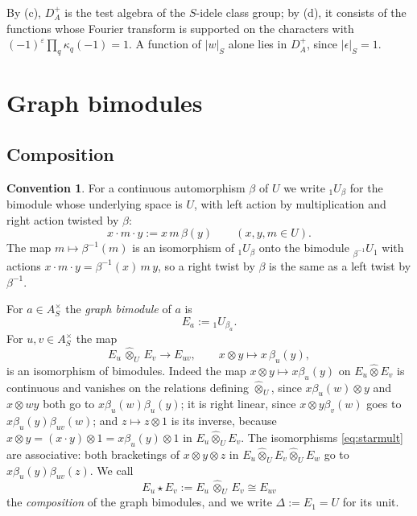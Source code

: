 \documentclass[11pt]{amsart}
\theoremstyle{definition}
\newtheorem{convention}[theorem]{Convention}
\theoremstyle{remark}
\newcommand{\DA}{D_A}
\begin{document}
By (c), $\DA^{+}$ is the test algebra of the $S$-idele class group; by (d),
it consists of the functions whose Fourier transform is supported on the
characters with $(-1)^{\varepsilon}\prod_q\kappa_q(-1)=1$.  A function of
$|w|_S$ alone lies in $\DA^{+}$, since $|\epsilon|_S=1$.

\section{Graph bimodules}\label{sec:cat}

\subsection{Composition}

\begin{convention}\label{conv:twist}
For a continuous automorphism $\beta$ of $U$ we write ${}_{1}U_{\beta}$ for the
bimodule whose underlying space is $U$, with left action by multiplication and
right action twisted by $\beta$:
\[
x\cdot m\cdot y:=x\,m\,\beta(y)\qquad(x,y,m\in U).
\]
The map $m\mapsto\beta^{-1}(m)$ is an isomorphism of ${}_{1}U_{\beta}$ onto the
bimodule ${}_{\beta^{-1}}U_{1}$ with actions $x\cdot m\cdot y=\beta^{-1}(x)\,m\,y$,
so a right twist by $\beta$ is the same as a left twist by $\beta^{-1}$.
\end{convention}

For $a\in A_S^{\times}$ the \emph{graph bimodule} of $a$ is
\begin{equation}\label{eq:graphbimod}
E_a:={}_{1}U_{\beta_a} .
\end{equation}
For $u,v\in A_S^{\times}$ the map
\begin{equation}\label{eq:starmult}
E_u\,\widehat\otimes_U\,E_v\longrightarrow E_{uv},\qquad
x\otimes y\mapsto x\,\beta_u(y),
\end{equation}
is an isomorphism of bimodules.  Indeed the map
$x\otimes y\mapsto x\beta_u(y)$ on $E_u\widehat\otimes E_v$ is continuous and
vanishes on the relations defining $\widehat\otimes_U$, since
$x\beta_u(w)\otimes y$ and $x\otimes wy$ both go to $x\beta_u(w)\beta_u(y)$; it
is right linear, since $x\otimes y\beta_v(w)$ goes to
$x\beta_u(y)\beta_{uv}(w)$; and $z\mapsto z\otimes1$ is its inverse, because
$x\otimes y=(x\cdot y)\otimes1=x\beta_u(y)\otimes1$ in
$E_u\widehat\otimes_UE_v$.  The isomorphisms \eqref{eq:starmult} are
associative: both bracketings of $x\otimes y\otimes z$ in
$E_u\widehat\otimes_UE_v\widehat\otimes_UE_w$ go to
$x\beta_u(y)\beta_{uv}(z)$.  We call
\[
E_u\star E_v:=E_u\,\widehat\otimes_U\,E_v\cong E_{uv}
\]
the \emph{composition} of the graph bimodules, and we write $\Delta:=E_1=U$
for its unit.
\end{document}
